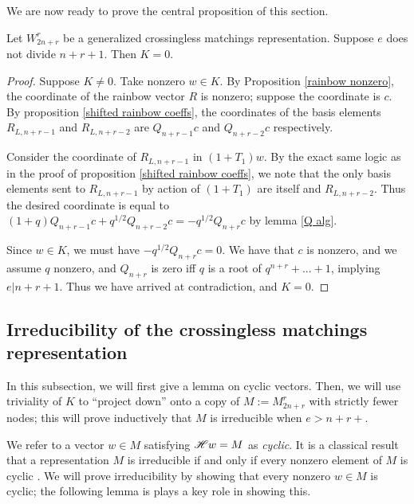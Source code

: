 \documentclass{amsart}
\begin{document}
We are now ready to prove the central proposition of this section.


\begin{proposition}
	Let $W_{2n+r}^r$ be a generalized crossingless matchings representation. Suppose $e$ does not divide $n+r+1$. Then $K=0$.
	
	\label{trivial kernel}
\end{proposition}

\begin{proof}
	Suppose $K\not=0$. Take nonzero $w\in K$. By Proposition \ref{rainbow nonzero}, the coordinate of the rainbow vector $R$ is nonzero; suppose the coordinate is $c$. By proposition \ref{shifted rainbow coeffs}, the coordinates of the basis elements $R_{L,n+r-1}$ and $R_{L,n+r-2}$ are $Q_{n+r-1}c$ and $Q_{n+r-2}c$ respectively.
	
	Consider the coordinate of $R_{L,n+r-1}$ in $(1+T_1)w$. By the exact same logic as in the proof of proposition \ref{shifted rainbow coeffs}, we note that the only basis elements sent to $R_{L,n+r-1}$ by action of $(1+T_1)$ are itself and $R_{L,n+r-2}$. Thus the desired coordinate is equal to $(1+q)Q_{n+r-1}c+q^{1/2}Q_{n+r-2}c=-q^{1/2}Q_{n+r}c$ by lemma \ref{Q alg}. 
	
	Since $w\in K$, we must have $-q^{1/2}Q_{n+r}c=0$. We have that $c$ is nonzero, and we assume $q$ nonzero, and $Q_{n+r}$ is zero iff $q$ is a root of $q^{n+r}+...+1$, implying $e|n+r+1$. Thus we have arrived at contradiction, and $K=0$.
\end{proof}

\subsection{Irreducibility of the crossingless matchings representation}
In this subsection, we will first give a lemma on cyclic vectors.
Then, we will use triviality of $K$ to ``project down'' onto a copy of $M := M_{2n + r}^r$ with strictly fewer nodes;
this will prove inductively that $M$ is irreducible when $e > n + r + $.

We refer to a vector $w \in M$ satisfying $\mathscr{H} w = M$ as \emph{cyclic}.
It is a classical result that a representation $M$ is irreducible if and only if every nonzero element of $M$ is cyclic \cite{Etingof}.
We will prove irreducibility by showing that every nonzero $w \in M$ is cyclic;
the following lemma is plays a key role in showing this.
\end{document}
